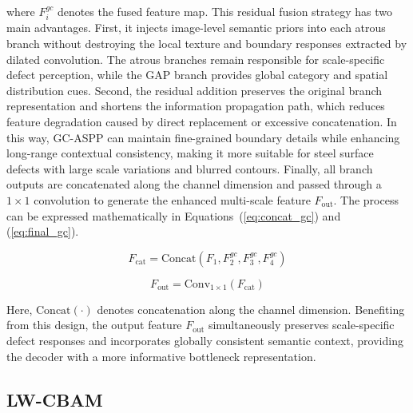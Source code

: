 \documentclass[sn-basic]{sn-jnl}
\theoremstyle{thmstyleone}%
\theoremstyle{thmstyletwo}%
\theoremstyle{thmstylethree}%
\begin{document}
where $F_i^{gc}$ denotes the fused feature map. This residual fusion strategy has two main advantages. First, it injects image-level semantic priors into each atrous branch without destroying the local texture and boundary responses extracted by dilated convolution. The atrous branches remain responsible for scale-specific defect perception, while the GAP branch provides global category and spatial distribution cues. Second, the residual addition preserves the original branch representation and shortens the information propagation path, which reduces feature degradation caused by direct replacement or excessive concatenation. In this way, GC-ASPP can maintain fine-grained boundary details while enhancing long-range contextual consistency, making it more suitable for steel surface defects with large scale variations and blurred contours. Finally, all branch outputs are concatenated along the channel dimension and passed through a $1\times1$ convolution to generate the enhanced multi-scale feature $F_\text{out}$. The process can be expressed mathematically in Equations~(\ref{eq:concat_gc}) and (\ref{eq:final_gc}).

\begin{equation}
F_\text{cat} = \text{Concat}(F_1, F_2^{gc}, F_3^{gc}, F_4^{gc})
\label{eq:concat_gc}
\end{equation}

\begin{equation}
F_\text{out} = \text{Conv}_{1\times1}(F_\text{cat})
\label{eq:final_gc}
\end{equation}

Here, $\text{Concat}(\cdot)$ denotes concatenation along the channel dimension. Benefiting from this design, the output feature $F_\text{out}$ simultaneously preserves scale-specific defect responses and incorporates globally consistent semantic context, providing the decoder with a more informative bottleneck representation.

\subsection{LW-CBAM}
\end{document}
